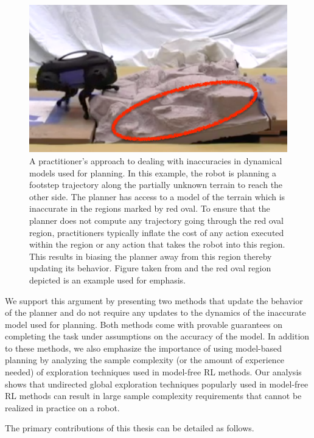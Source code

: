 \begin{figure}[t]
  \centering
  \includegraphics[width=0.5\linewidth]{Figures/intro/zucker}
  \caption{A practitioner's approach to dealing with inaccuracies in
    dynamical models used for planning. In this example, the robot is
    planning a footstep trajectory along the partially unknown terrain
  to reach the other side. The planner has access to a model of the
  terrain which is inaccurate in the regions marked by red oval. To
  ensure that the planner does not compute any trajectory going
  through the red oval region, practitioners typically inflate the
  cost of any action executed within the region or any action that
  takes the robot into this region. This results in biasing the
  planner away from this region thereby updating its behavior. Figure
  taken from \cite{DBLP:journals/ijrr/ZuckerRSCBAK11} and the red oval
  region depicted is an example used for emphasis.}
\label{fig:zucker}
\end{figure}

We support this argument by presenting two methods that update the
behavior of the planner and do not require any updates to the dynamics
of the inaccurate model used for planning.  Both methods come with
provable guarantees on completing the task under assumptions on the
accuracy of the model. In addition to these methods, we also emphasize
the importance of using model-based planning
by analyzing the sample complexity (or the amount of experience
needed) of exploration techniques used in model-free RL methods. Our
analysis shows that undirected global exploration techniques popularly
used in model-free RL methods can result in large sample complexity
requirements that cannot be realized in practice on a robot.

The primary contributions of this thesis can be detailed as follows.

